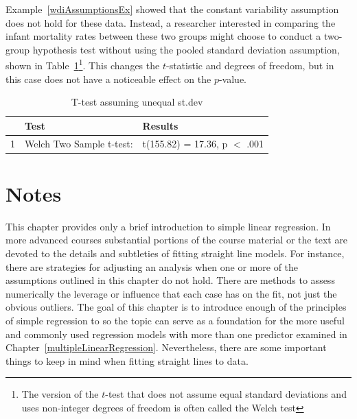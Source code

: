 

Example~\ref{wdiAssumptionsEx} showed that the constant variability assumption does not hold for these data. Instead, a researcher interested in comparing the infant mortality rates between these two groups might choose to conduct a two-group hypothesis test without using the pooled standard deviation assumption, shown in Table~\ref{tTestSanitUnEqualStd}\footnote{The version of the $t$-test that does not assume equal standard deviations and uses non-integer degrees of freedom is often called the Welch test}. This changes the $t$-statistic and degrees of freedom, but in this case does not have a noticeable effect on the $p$-value.

\begin{table}[ht]
\centering
\begin{tabular}{rll}
  \hline
 & Test & Results \\ 
  \hline
1 & Welch Two Sample t-test: & t(155.82) = 17.36, p $<$ .001 \\ 
   \hline
\end{tabular}
\caption{T-test assuming unequal st.dev} 
\label{tTestSanitUnEqualStd}
\end{table}


\section{Notes}

This chapter provides only a brief introduction to simple linear regression.   In more advanced courses substantial portions of the course material or the text are devoted to the details and subtleties of fitting straight line models. For instance,  there are strategies for adjusting an analysis when one or more of the assumptions outlined in this chapter do not hold. There are methods to assess numerically the leverage or influence that each case has on the fit, not just the obvious outliers.  The goal of this chapter is to introduce enough of the principles of simple regression to so the topic can serve as a foundation for the more useful and commonly used regression models with more than one predictor examined in Chapter~\ref{multipleLinearRegression}.  Nevertheless, there are some important things to keep in mind when fitting straight lines to data.

